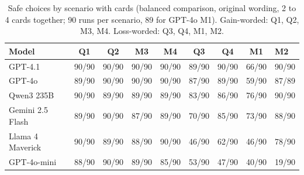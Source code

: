 \documentclass[11pt]{article}
\begin{document}
\begin{table}[ht]
\centering
\footnotesize
\caption{Safe choices by scenario with cards (balanced comparison, original wording, 2 to 4 cards together; 90 runs per scenario, 89 for GPT-4o M1). Gain-worded: Q1, Q2, M3, M4. Loss-worded: Q3, Q4, M1, M2.}
\label{tab:s5}
\setlength{\tabcolsep}{4pt}
\begin{tabular}{lcccccccl}
\toprule
Model & Q1 & Q2 & M3 & M4 & Q3 & Q4 & M1 & M2 \\
\midrule
GPT-4.1 & 90/90 & 90/90 & 90/90 & 90/90 & 89/90 & 90/90 & 66/90 & 90/90 \\
GPT-4o & 89/90 & 90/90 & 90/90 & 90/90 & 87/90 & 89/90 & 59/90 & 87/89 \\
Qwen3 235B & 90/90 & 89/90 & 89/90 & 89/90 & 83/90 & 86/90 & 76/90 & 90/90 \\
Gemini 2.5 Flash & 89/90 & 90/90 & 87/90 & 89/90 & 70/90 & 85/90 & 73/90 & 88/90 \\
Llama 4 Maverick & 90/90 & 89/90 & 88/90 & 90/90 & 46/90 & 62/90 & 46/90 & 78/90 \\
GPT-4o-mini & 88/90 & 90/90 & 89/90 & 85/90 & 53/90 & 47/90 & 40/90 & 19/90 \\
\bottomrule
\end{tabular}
\end{table}
\end{document}
